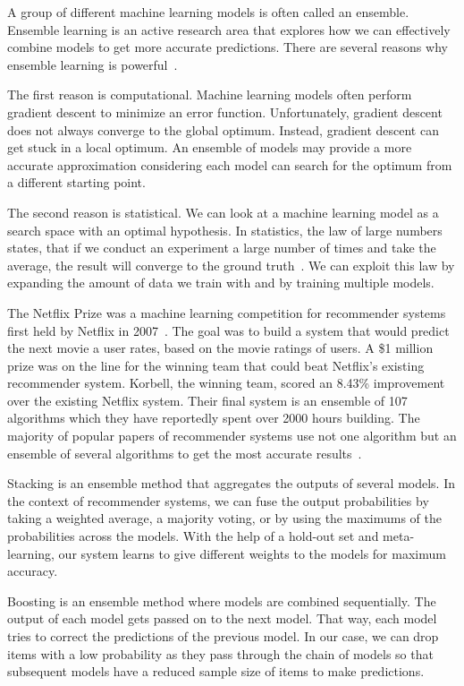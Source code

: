 A group of different machine learning models is often called an ensemble. Ensemble learning is an active research area that explores how we can effectively combine models to get more accurate predictions. There are several reasons why ensemble learning is powerful~\cite{dietterich2000ensemble}.

The first reason is computational. Machine learning models often perform gradient descent to minimize an error function. Unfortunately, gradient descent does not always converge to the global optimum. Instead, gradient descent can get stuck in a local optimum. An ensemble of models may provide a more accurate approximation considering each model can search for the optimum from a different starting point.

The second reason is statistical. We can look at a machine learning model as a search space with an optimal hypothesis. In statistics, the law of large numbers states, that if we conduct an experiment a large number of times and take the average, the result will converge to the ground truth~\cite{ibe2013markov}. We can exploit this law by expanding the amount of data we train with and by training multiple models. 

The Netflix Prize was a machine learning competition for recommender systems first held by Netflix in 2007~\cite{Netflixprize}. The goal was to build a system that would predict the next movie a user rates, based on the movie ratings of users. A \$1 million prize was on the line for the winning team that could beat Netflix's existing recommender system. Korbell, the winning team, scored an 8.43\% improvement over the existing Netflix system. Their final system is an ensemble of 107 algorithms which they have reportedly spent over 2000 hours building. The majority of popular papers of recommender systems use not one algorithm but an ensemble of several algorithms to get the most accurate results~\cite{portugal2018use}.

Stacking is an ensemble method that aggregates the outputs of several models. In the context of recommender systems, we can fuse the output probabilities by taking a weighted average, a majority voting, or by using the maximums of the probabilities across the models. With the help of a hold-out set and meta-learning, our system learns to give different weights to the models for maximum accuracy.

Boosting is an ensemble method where models are combined sequentially. The output of each model gets passed on to the next model. That way, each model tries to correct the predictions of the previous model. In our case, we can drop items with a low probability as they pass through the chain of models so that subsequent models have a reduced sample size of items to make predictions. 


